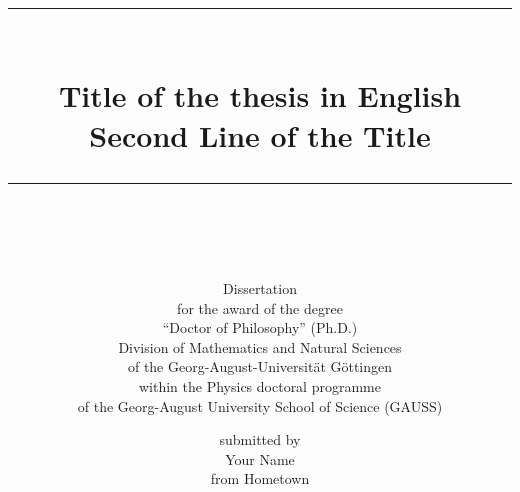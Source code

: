 %
%

\newcommand{\HRule}{\rule{\linewidth}{0.5mm}}

\title{%
  \HRule\\[0.4cm]
  \Large
  Title of the thesis in English\\ Second Line of the Title
  \HRule\\[1.5cm]
}

\subtitle{%
Dissertation\\[1.0cm]
for the award of the degree\\[0.5ex]
``Doctor of Philosophy'' (Ph.D.)\\[0.5ex]
Division of Mathematics and Natural Sciences\\[0.5ex]
of the Georg-August-Universit\"at G\"ottingen\\[1.0cm]
within the Physics doctoral programme\\[0.5ex]
of the Georg-August University School of Science (GAUSS)\\[2.0cm]
}

\author{%
\large
submitted by\\[1.0cm]
\large
Your Name\\[0.5cm]
\large
from Hometown\\[2.0cm]
}

\date{}
\publishers{%
\large
G\"ottingen, 20XX
}

